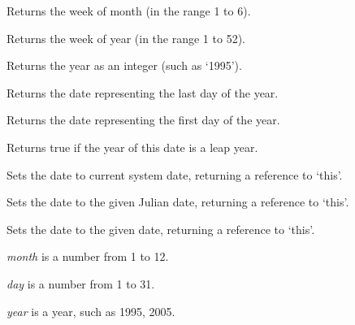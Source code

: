 \label{wxdategetweekofmonth}


Returns the week of month (in the range 1 to 6).

\label{wxdategetweekofyear}


Returns the week of year (in the range 1 to 52).

\label{wxdategetyear}


Returns the year as an integer (such as `1995').

\label{wxdategetyearend}


Returns the date representing the last day of the year.

\label{wxdategetyearstart}


Returns the date representing the first day of the year.

\label{wxdateisleapyear}


Returns true if the year of this date is a leap year.

\label{wxdateset}


Sets the date to current system date, returning a reference to `this'.


Sets the date to the given Julian date, returning a reference to `this'.


Sets the date to the given date, returning a reference to `this'.

{\it month} is a number from 1 to 12.

{\it day} is a number from 1 to 31.

{\it year} is a year, such as 1995, 2005.

\label{wxdatesetformat}

